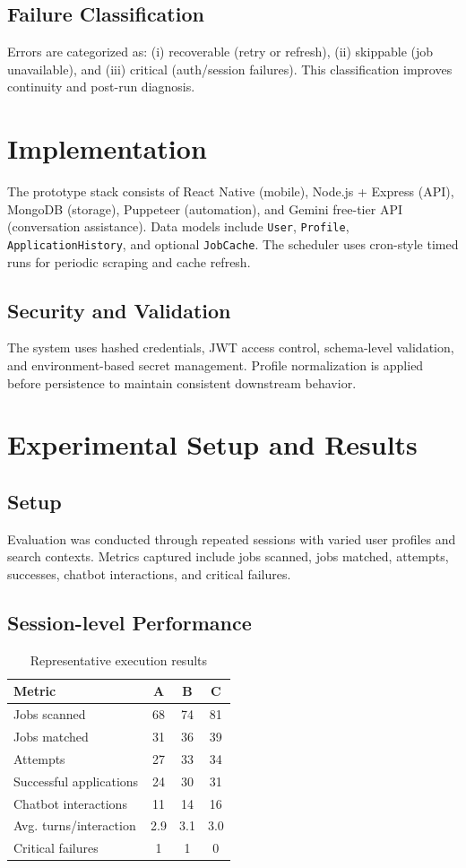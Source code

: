 \documentclass[conference]{IEEEtran}
\begin{document}
\subsection{Failure Classification}
Errors are categorized as: (i) recoverable (retry or refresh), (ii) skippable (job unavailable), and (iii) critical (auth/session failures). This classification improves continuity and post-run diagnosis.

\section{Implementation}
The prototype stack consists of React Native (mobile), Node.js + Express (API), MongoDB (storage), Puppeteer (automation), and Gemini free-tier API (conversation assistance). Data models include \texttt{User}, \texttt{Profile}, \texttt{ApplicationHistory}, and optional \texttt{JobCache}. The scheduler uses cron-style timed runs for periodic scraping and cache refresh.

\subsection{Security and Validation}
The system uses hashed credentials, JWT access control, schema-level validation, and environment-based secret management. Profile normalization is applied before persistence to maintain consistent downstream behavior.

\section{Experimental Setup and Results}
\subsection{Setup}
Evaluation was conducted through repeated sessions with varied user profiles and search contexts. Metrics captured include jobs scanned, jobs matched, attempts, successes, chatbot interactions, and critical failures.

\subsection{Session-level Performance}
\begin{table}[!t]
\centering
\caption{Representative execution results}
\label{tab:results}
\begin{tabular}{lccc}
\toprule
\textbf{Metric} & \textbf{A} & \textbf{B} & \textbf{C} \\
\midrule
Jobs scanned & 68 & 74 & 81 \\
Jobs matched & 31 & 36 & 39 \\
Attempts & 27 & 33 & 34 \\
Successful applications & 24 & 30 & 31 \\
Chatbot interactions & 11 & 14 & 16 \\
Avg. turns/interaction & 2.9 & 3.1 & 3.0 \\
Critical failures & 1 & 1 & 0 \\
\bottomrule
\end{tabular}
\end{table}
\end{document}
